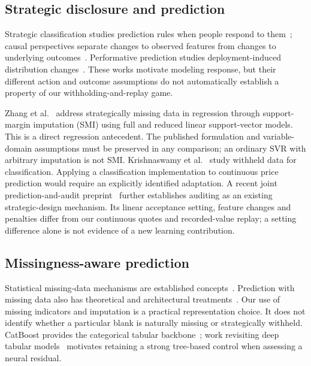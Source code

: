 \documentclass[10pt,journal]{IEEEtran}
\begin{document}
\subsection{Strategic disclosure and prediction}
Strategic classification studies prediction rules when people respond to
them~\cite{hardt2016strategic,dong2018preferences}; causal perspectives
separate changes to observed features from changes to underlying
outcomes~\cite{miller2020causal}. Performative prediction studies
deployment-induced distribution changes~\cite{perdomo2020performative}.
These works motivate modeling response, but their different action and
outcome assumptions do not automatically establish a property of our
withholding-and-replay game.

Zhang et al.~\cite{zhang2020strategic} address strategically missing data
in regression through support-margin imputation (SMI) using full and
reduced linear support-vector models. This is a direct regression
antecedent. The published formulation and variable-domain assumptions
must be preserved in any comparison; an ordinary SVR with arbitrary
imputation is not SMI. Krishnaswamy et al.~\cite{krishnaswamy2021withheld}
study withheld data for classification. Applying a classification
implementation to continuous price prediction would require an explicitly
identified adaptation. A recent joint prediction-and-audit
preprint~\cite{ebrahimi2026audit} further establishes auditing as an
existing strategic-design mechanism. Its linear acceptance setting,
feature changes and penalties differ from our continuous quotes and
recorded-value replay; a setting difference alone is not evidence of a
new learning contribution.

\subsection{Missingness-aware prediction}
Statistical missing-data mechanisms are established
concepts~\cite{rubin1976missing}. Prediction with missing data also has
theoretical and architectural treatments~\cite{lemorvan2021imputation,
lemorvan2020neumiss}. Our use of missing indicators and imputation is a
practical representation choice. It does not identify whether a particular
blank is naturally missing or strategically withheld. CatBoost provides
the categorical tabular backbone~\cite{prokhorenkova2018catboost}; work
revisiting deep tabular models~\cite{gorishniy2021tabular} motivates
retaining a strong tree-based control when assessing a neural residual.
\end{document}
